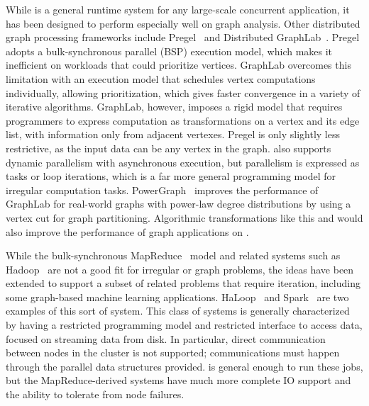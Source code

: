 \vspace{0.5ex}
While \Grappa is a general runtime system for any large-scale
concurrent application, it has been designed to perform especially
well on graph analysis. Other distributed graph processing frameworks
include Pregel~\cite{pregel:2010} and Distributed
GraphLab~\cite{distgraphlab:vldb12}. Pregel adopts a bulk-synchronous
parallel (BSP) execution model, which makes it inefficient on
workloads that could prioritize vertices. GraphLab overcomes this
limitation with an execution model that schedules vertex computations
individually, allowing prioritization, which gives faster convergence
in a variety of iterative algorithms. GraphLab, however, imposes a
rigid model that requires programmers to express computation as
transformations on a vertex and its edge list, with information only
from adjacent vertexes. Pregel is only slightly less restrictive, as
the input data can be any vertex in the graph. \Grappa also supports
dynamic parallelism with asynchronous execution, but parallelism is
expressed as tasks or loop iterations, which is a far more general
programming model for irregular computation tasks.
PowerGraph~\cite{powergraph:osdi12} improves the performance of
GraphLab for real-world graphs with power-law degree distributions by
using a vertex cut for graph partitioning. Algorithmic transformations
like this  and would also improve the
performance of graph applications on \Grappa.

While the bulk-synchronous MapReduce~\cite{Dean:2008:MSD:1327452.1327492} model and
related systems such as Hadoop~\cite{hadoop} are not a good fit for
irregular or graph problems, the ideas have been extended to support a
subset of related problems that require iteration, including some
graph-based machine learning
applications. HaLoop~\cite{Bu:2010:HEI:1920841.1920881} and
Spark~\cite{Zaharia:2010:SCC:1863103.1863113} are two examples of this
sort of system. This class of systems is generally characterized by
having a restricted programming model and restricted interface to
access data, focused on streaming data from disk. In particular,
direct communication between nodes in the cluster is not supported;
communications must happen through the  parallel data
structures provided. \Grappa is general enough to run these jobs, but the
MapReduce-derived systems have much more complete IO support and the
ability to tolerate from node failures.



